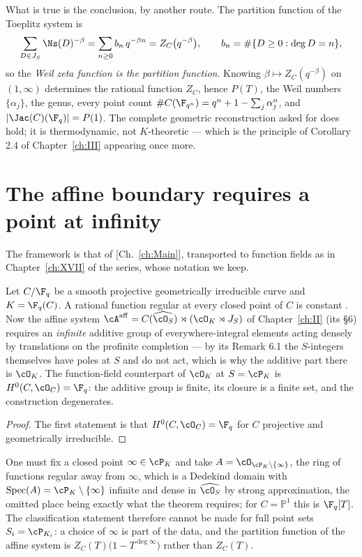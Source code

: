 \begin{summary}
What is true is the conclusion, by another route. The partition function of the Toeplitz
system is
\[
\sum_{D\in J_S}\Ns(D)^{-\beta}=\sum_{n\ge0}b_n\,q^{-\beta n}=Z_C\bigl(q^{-\beta}\bigr),
\qquad b_n=\#\{D\ge0:\deg D=n\},
\]
so the \emph{Weil zeta function is the partition function}. Knowing $\beta\mapsto Z_C(q^{-\beta})$
on $(1,\infty)$ determines the rational function $Z_C$, hence $P(T)$, the Weil numbers
$\{\alpha_j\}$, the genus, every point count $\#C(\F_{q^n})=q^n+1-\sum_j\alpha_j^n$, and
$|\Jac(C)(\F_q)|=P(1)$. The complete geometric reconstruction asked for does hold; it is
thermodynamic, not $K$-theoretic --- which is the principle of Corollary 2.4 of Chapter~\ref{ch:III}
appearing once more.
\end{summary}


\section{The affine boundary requires a point at infinity}

The framework is that of [Ch.~\ref{ch:Main}], transported to function fields as in Chapter~\ref{ch:XVII} of the
series, whose notation we keep.\begin{proposition}[Degeneration for $S=\cP_K$]\label{XVIII:prop:infinity}
Let $C/\F_q$ be a smooth projective geometrically irreducible curve and $K=\F_q(C)$. A
rational function regular at every closed point of $C$ is constant \cite{Rosen}. Now the
affine system
$\cA^{\mathrm{aff}}=C(\widehat{\cO_S})\rtimes(\cO_K\rtimes J_S)$ of Chapter~\ref{ch:II} (its \S6)
requires an \emph{infinite} additive group of everywhere-integral elements acting densely by
translations on the profinite completion --- by its Remark 6.1 the $S$-integers themselves
have poles at $S$ and do not act, which is why the additive part there is $\cO_K$. The
function-field counterpart of $\cO_K$ at $S=\cP_K$ is $H^0(C,\cO_C)=\F_q$: the additive
group is finite, its closure is a finite set, and the construction degenerates.
\end{proposition}

\begin{proof}
The first statement is that $H^0(C,\cO_C)=\F_q$ for $C$ projective and geometrically
irreducible.
\end{proof}

\begin{corollary}\label{XVIII:cor:affine}
One must fix a closed point $\infty\in\cP_K$ and take $A=\cO_{\cP_K\setminus\{\infty\}}$, the
ring of functions regular away from $\infty$, which is a Dedekind domain with
$\mathrm{Spec}(A)=\cP_K\setminus\{\infty\}$ infinite and dense in
$\widehat{\cO_S}$ by strong approximation, the omitted place being exactly what the theorem
requires; for $C=\mathbb P^1$ this is $\F_q[T]$.
The classification statement therefore cannot be made for full point sets
$S_i=\cP_{K_i}$: a choice of $\infty$ is part of the data, and the partition function of the
affine system is $Z_C(T)\bigl(1-T^{\deg\infty}\bigr)$ rather than $Z_C(T)$.
\end{corollary}

